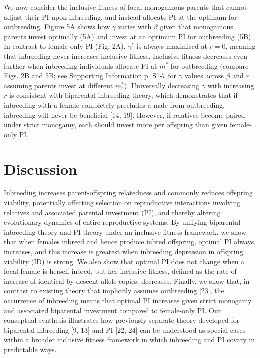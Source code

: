 \documentclass[12pt]{article}
\begin{document}
We now consider the inclusive fitness of focal monogamous parents that cannot adjust their PI upon inbreeding, and instead allocate PI at the optimum for outbreeding. Figure 5A shows how $\gamma$ varies with $\beta$ given that monogamous parents invest optimally (5A) and invest at an optimum PI for outbreeding (5B). In contrast to female-only PI (Fig. 2A), $\gamma^{*}$ is always maximised at $r=0$, meaning that inbreeding never increases inclusive fitness. Inclusive fitness decreases even further when inbreeding individuals allocate PI at $m^{*}$ for outbreeding (compare Figs. 2B and 5B; see Supporting Information p. S1-7 for $\gamma$ values across $\beta$ and $r$ assuming parents invest at different $m^{*}_{r}$). Universally decreasing $\gamma$ with increasing $r$ is consistent with biparental inbreeding theory, which demonstrates that if inbreeding with a female completely precludes a male from outbreeding, inbreeding will never be beneficial [14, 19]. However, if relatives become paired under strict monogamy, each should invest more per offspring than given female-only PI.

\section*{Discussion}

Inbreeding increases parent-offspring relatedness and commonly reduces offspring viability, potentially affecting selection on reproductive interactions involving relatives and associated parental investment (PI), and thereby altering evolutionary dynamics of entire reproductive systems.  By unifying biparental inbreeding theory and PI theory under an inclusive fitness framework, we show that when females inbreed and hence produce inbred offspring, optimal PI always increases, and this increase is greatest when inbreeding depression in offspring viability (ID) is strong. We also show that optimal PI does not change when a focal female is herself inbred, but her inclusive fitness, defined as the rate of increase of identical-by-descent allele copies, decreases. Finally, we show that, in contrast to existing theory that implicitly assumes outbreeding [23], the occurrence of inbreeding means that optimal PI increases given strict monogamy and associated biparental investment compared to female-only PI. Our conceptual synthesis illustrates how previously separate theory developed for biparental inbreeding [9, 13] and PI [22, 24] can be understood as special cases within a broader inclusive fitness framework in which inbreeding and PI covary in predictable ways.
\end{document}
